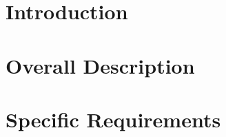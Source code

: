 \documentclass{Configuration_Files/PoliMi3i_thesis}
\begin{document}
    \mainmatter %


    \chapter{Introduction}
    \label{ch:introduction}%
    


    \chapter{Overall Description}
    \label{ch:overall_description}%
    


    \chapter{Specific Requirements}
    \label{ch:specific_requirements}%
    



    \listoffigures
    
    \listoftables
    \cleardoublepage
\end{document}
